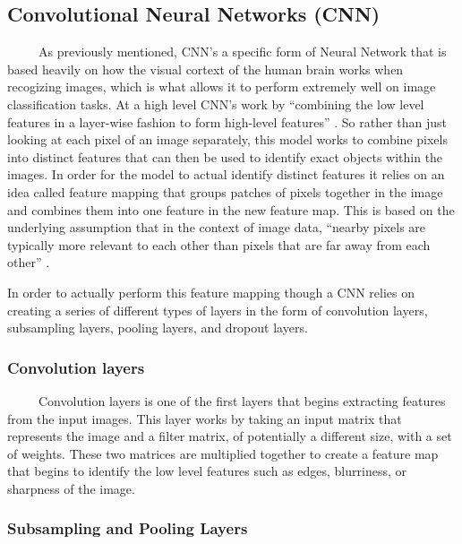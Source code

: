 \documentclass[12pt]{article}
\begin{document}
\hypertarget{convolutional-neural-networks-cnn}{%
\subsection{Convolutional Neural Networks
(CNN)}\label{convolutional-neural-networks-cnn}}

~~~~~As previously mentioned, CNN's a specific form of Neural Network
that is based heavily on how the visual cortext of the human brain works
when recogizing images, which is what allows it to perform extremely
well on image classification tasks. At a high level CNN's work by
``combining the low level features in a layer-wise fashion to form
high-level features'' \citet{PML}. So rather than just looking at each
pixel of an image separately, this model works to combine pixels into
distinct features that can then be used to identify exact objects within
the images. In order for the model to actual identify distinct features
it relies on an idea called feature mapping that groups patches of
pixels together in the image and combines them into one feature in the
new feature map. This is based on the underlying assumption that in the
context of image data, ``nearby pixels are typically more relevant to
each other than pixels that are far away from each other'' \citet{PML}.

In order to actually perform this feature mapping though a CNN relies on
creating a series of different types of layers in the form of
convolution layers, subsampling layers, pooling layers, and dropout
layers.

\hypertarget{convolution-layers}{%
\subsubsection{Convolution layers}\label{convolution-layers}}

~~~~~Convolution layers is one of the first layers that begins
extracting features from the input images. This layer works by taking an
input matrix that represents the image and a filter matrix, of
potentially a different size, with a set of weights. These two matrices
are multiplied together to create a feature map that begins to identify
the low level features such as edges, blurriness, or sharpness of the
image.

\hypertarget{subsampling-and-pooling-layers}{%
\subsubsection{Subsampling and Pooling
Layers}\label{subsampling-and-pooling-layers}}
\end{document}
